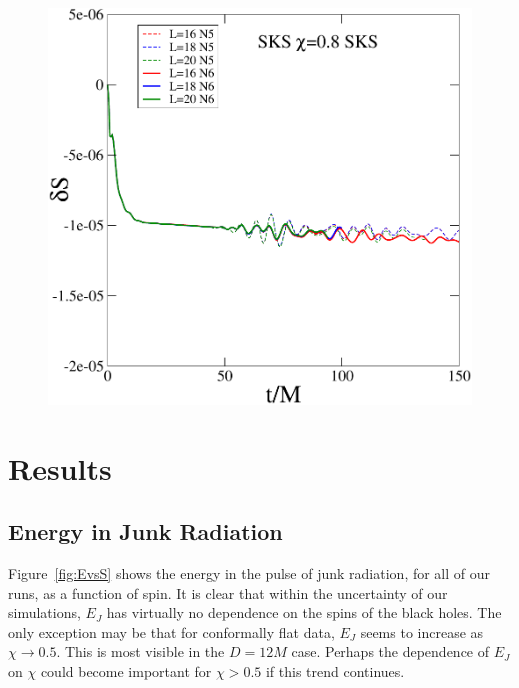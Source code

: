 \documentclass[aps,prd,amsmath,floatfix,twocolumn,superscriptaddress,nofootinbib,showpacs]{revtex4-1}
\theoremstyle{plain}
\theoremstyle{definition}
\begin{document}
\begin{figure}
  \includegraphics[width=0.99\columnwidth]{dS_SKS_S8}
\end{figure}





\section{Results}
\label{sec:Results}




\subsection{Energy in Junk Radiation}

Figure~\ref{fig:EvsS} shows the energy in the pulse of junk radiation,
for all of our runs, as a function of spin. It is clear that within
the uncertainty of our simulations, $E_J$ has virtually no dependence
on the spins of the black holes. The only exception may be that for
conformally flat data, $E_J$ seems to increase as $\chi\rightarrow
0.5$. This is most visible in the $D=12M$ case. Perhaps the dependence
of $E_J$ on $\chi$ could become important for $\chi > 0.5$ if this
trend continues.
\end{document}
